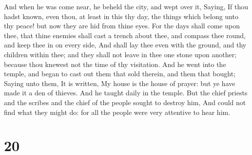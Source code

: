  And when he was come near, he beheld the city, and wept
over it,  Saying, If thou hadst known, even thou, at least
in this thy day, the things which belong unto thy peace! but now they
are hid from thine eyes.  For the days shall come upon
thee, that thine enemies shall cast a trench about thee, and compass
thee round, and keep thee in on every side,  And shall lay
thee even with the ground, and thy children within thee; and they shall
not leave in thee one stone upon another; because thou knewest not the
time of thy visitation.  And he went into the temple, and
began to cast out them that sold therein, and them that bought;
 Saying unto them, It is written, My house is the house of
prayer: but ye have made it a den of thieves.  And he
taught daily in the temple. But the chief priests and the scribes and
the chief of the people sought to destroy him,  And could
not find what they might do: for all the people were very attentive to
hear him.

\hypertarget{section-19}{%
\section{20}\label{section-19}}

